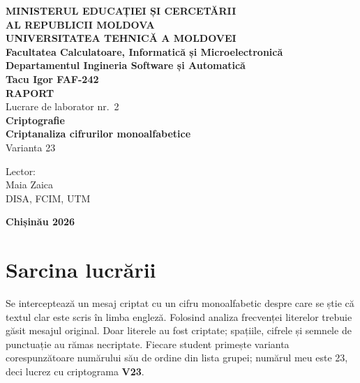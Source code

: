 \documentclass[12pt,a4paper]{article}
\begin{document}
\begin{titlepage}
\begin{center}
  \textbf{MINISTERUL EDUCAȚIEI ȘI CERCETĂRII}\\
  \textbf{AL REPUBLICII MOLDOVA}\\[0.5em]
  \textbf{UNIVERSITATEA TEHNICĂ A MOLDOVEI}\\
  \textbf{Facultatea Calculatoare, Informatică și Microelectronică}\\
  \textbf{Departamentul Ingineria Software și Automatică}\\[2em]

  \vspace{1.5cm}
  \textbf{\Large Tacu Igor \textemdash{} FAF-242}\\[3em]

  \textbf{\Large RAPORT}\\[0.5em]
  Lucrare de laborator nr.\ 2\\[0.5em]
  \textbf{Criptografie}\\[0.5em]
  \textbf{Criptanaliza cifrurilor monoalfabetice}\\[0.5em]
  Varianta 23\\[3em]

  \vfill
  \begin{flushright}
    Lector:\\
    Maia Zaica\\
    DISA, FCIM, UTM
  \end{flushright}
  \vfill

  \large \textbf{Chișinău \textemdash{} 2026}
\end{center}
\end{titlepage}

\tableofcontents
\newpage

\section{Sarcina lucrării}

Se interceptează un mesaj criptat cu un cifru monoalfabetic despre care se știe că
textul clar este scris în limba engleză. Folosind analiza frecvenței literelor trebuie
găsit mesajul original. Doar literele au fost criptate; spațiile, cifrele și
semnele de punctuație au rămas necriptate. Fiecare student primește varianta
corespunzătoare numărului său de ordine din lista grupei; numărul meu este 23, deci
lucrez cu criptograma \textbf{V23}.

\end{document}
